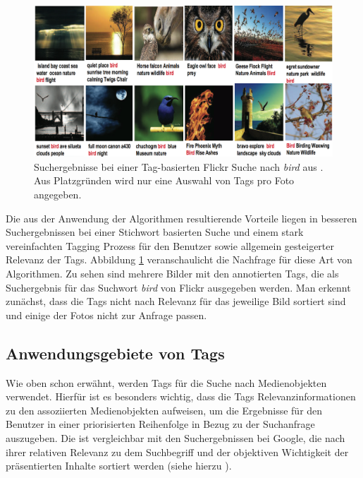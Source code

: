 \begin{figure}[htbp]
  \centering
    \includegraphics[height=0.5\textwidth]{images/bird_search_results_wide.png}
  \caption{Suchergebnisse bei einer Tag-basierten Flickr Suche nach \emph{bird} aus \cite{ranking}. Aus Platzgründen wird nur eine Auswahl von Tags pro Foto angegeben.}
  \label{fig:images_bird_search_results}
\end{figure}

Die aus der Anwendung der Algorithmen resultierende Vorteile liegen in besseren Suchergebnissen bei einer Stichwort basierten Suche und einem stark vereinfachten Tagging Prozess für den Benutzer sowie allgemein gesteigerter Relevanz der Tags. Abbildung \ref{fig:images_bird_search_results} veranschaulicht die Nachfrage für diese Art von Algorithmen. Zu sehen sind mehrere Bilder mit den annotierten Tags, die als Suchergebnis für das Suchwort \emph{bird} von Flickr ausgegeben werden. Man erkennt zunächst, dass die Tags nicht nach Relevanz für das jeweilige Bild sortiert sind und einige der Fotos nicht zur Anfrage passen.



\subsection{Anwendungsgebiete von Tags} %
\label{sub:anwendungsgebiete}

Wie oben schon erwähnt, werden Tags für die Suche nach Medienobjekten verwendet. Hierfür ist es besonders wichtig, dass die Tags Relevanzinformationen zu den assoziierten Medienobjekten aufweisen, um die Ergebnisse für den Benutzer in einer priorisierten Reihenfolge in Bezug zu der Suchanfrage auszugeben. Die ist vergleichbar mit den Suchergebnissen bei Google, die nach ihrer relativen Relevanz zu dem Suchbegriff und der objektiven Wichtigkeit der präsentierten Inhalte sortiert werden (siehe hierzu \cite{googlePageRank}).

